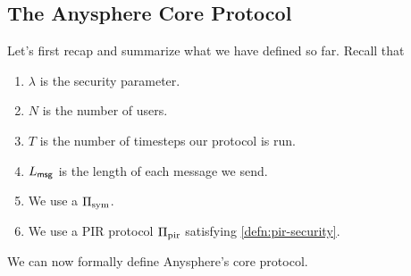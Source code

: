 \subsection{The Anysphere Core Protocol}
Let's first recap and summarize what we have defined so far. Recall that
\begin{enumerate}
    \item $\lambda$ is the security parameter.
    \item $N$ is the number of users.
    \item $T$ is the number of timesteps our protocol is run.
    \item $L_{\mathsf{msg}}$ is the length of each message we send.
    \item We use a  $\Pi_{\text{sym}}$.
    \item We use a PIR protocol $\Pi_{\text{pir}}$ satisfying \cref{defn:pir-security}.
\end{enumerate}
We can now formally define Anysphere's core protocol.
